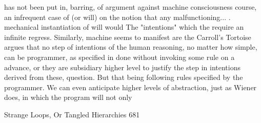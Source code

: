    has not been put in, barring, of          argument against machine consciousness
   course, an infrequent case of             (or will) on the notion that any
   malfunctioning... .                       mechanical instantiation of will would
   The "intentions" which the                require an infinite regress. Similarly,
   machine seems to manifest are the         Carroll's Tortoise argues that no step of
   intentions     of     the     human       reasoning, no matter how simple, can be
   programmer, as specified in               done without invoking some rule on a
   advance, or they are subsidiary           higher level to justify the step in
   intentions derived from these,            question. But that being
   following rules specified by the
   programmer. We can even
   anticipate    higher     levels   of
   abstraction, just as Wiener does, in
   which the program will not only

Strange Loops, Or Tangled Hierarchies                                             681

